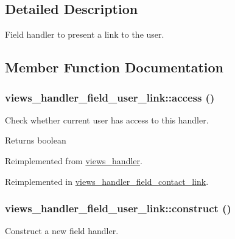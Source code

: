 \subsection{Detailed Description}
Field handler to present a link to the user. 

\subsection{Member Function Documentation}
\hypertarget{classviews__handler__field__user__link_a00708207b597556c70cba91816a03963}{
\subsubsection[{access}]{\setlength{\rightskip}{0pt plus 5cm}views\_\-handler\_\-field\_\-user\_\-link::access ()}}
\label{classviews__handler__field__user__link_a00708207b597556c70cba91816a03963}
Check whether current user has access to this handler.

\begin{DoxyReturn}{Returns}
boolean 
\end{DoxyReturn}


Reimplemented from \hyperlink{classviews__handler_a3f2fbfe1e0849d06ae77149412b821f6}{views\_\-handler}.

Reimplemented in \hyperlink{classviews__handler__field__contact__link_a5785d1771c75ad924557c3df87d6288b}{views\_\-handler\_\-field\_\-contact\_\-link}.\hypertarget{classviews__handler__field__user__link_a3c0e66ff0504b344066db923819456f7}{
\subsubsection[{construct}]{\setlength{\rightskip}{0pt plus 5cm}views\_\-handler\_\-field\_\-user\_\-link::construct ()}}
\label{classviews__handler__field__user__link_a3c0e66ff0504b344066db923819456f7}
Construct a new field handler. 

